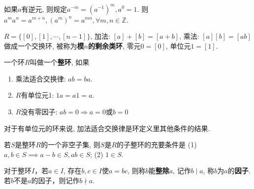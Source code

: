 \begin{Proposition}
如果$a$有逆元, 则规定$a^{-m} = {(a^{-1})}^m, a^0 = \mathfrak{1}$. 则$a^m a^n = a^{m+n}, {(a^m)}^n = a^{mn}, \forall m, n \in \mathbb{Z}$.
\end{Proposition}

\begin{Proposition}[模$n$的剩余类环]
$R = \{ [0], [1], \cdots, [n-1] \}$, 加法: $[a] + [b] = [a+b]$, 乘法: $[a][b] = [ab]$做成一个交换环, 被称为\textbf{模$n$的剩余类环}, 零元$\mathfrak{0} = [0]$, 单位元$\mathfrak{1} = [1]$.
\end{Proposition}

\begin{Definition}[整环]
一个环$R$叫做一个\textbf{整环}, 如果
\begin{enumerate}
	\item 乘法适合交换律: $ab = ba$.
	\item $R$有单位元1: $\mathfrak{1}a = a\mathfrak{1} = a$.
	\item $R$没有零因子: $ab = \mathfrak{0} \Rightarrow a = \mathfrak{0}$或$b = \mathfrak{0}$
\end{enumerate}
\end{Definition}

\begin{Proposition}
对于有单位元的环来说, 加法适合交换律是环定义里其他条件的结果.
\end{Proposition}


\begin{Theorem}
若$S$是整环$R$的一个非空子集, 则$S$是$R$的子整环的充要条件是 (1)$a, b \in S \implies a-b \in S, ab \in S$; (2) $1 \in S$.
\end{Theorem}



\begin{Definition}[!整除]
对于整环$I$，若$a \in I$, 存在$b, c \in I$使$a=bc$, 则称$b$能\textbf{整除}$a$, 记作$b \mid a$, 称$b$为$a$的\textbf{因子}. 若$b$不是$a$的因子，则记作$b \nmid a$.
\end{Definition}

